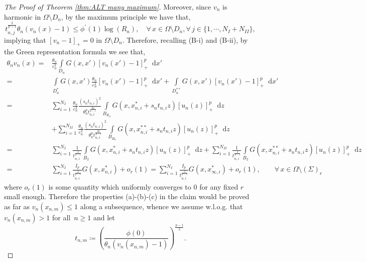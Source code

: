 \documentclass[10pt]{amsart}
\newcommand{\parenthesis}[1]{\left(#1\right)} %
\newcommand{\dd}{\mathop{}\!\mathrm{d}}
\newcommand{\eps}{\varepsilon}
\newcommand{\ii}{\infty}
\newcommand{\om}{\Omega}
\begin{document}
\begin{proof}[The Proof of Theorem \ref{thm:ALT many maximum}]
    Moreover, since $v_n$ is harmonic in $\om\setminus D_n$, by the maximum principle we have that,
    $$
    t_{n,j}^{\frac{2}{p-1}}\theta_n (v_n(x)-1)\leq \phi^{'}(1)\log(R_n),\quad \forall\,x \in \om\setminus D_n, \forall \,j\in\{1,\cdots,N_I+N_{II}\},
    $$
    implying that $[v_n-1]_+=0$ in  $\om\setminus D_n$. Therefore, recalling (B-i) and (B-ii), by the Green representation formula we see that,
    \begin{align} \nonumber
  \theta_n  v_n(x)= &\frac{\theta_n}{\eps_n^2}\int\limits_{D_n}G(x,x')[v_n(x')-1]^p_+\dd{x'}\\ \nonumber
    =&\int\limits_{D^*_n}G(x,x')\frac{\theta_n}{\eps_n^2}[v_n(x')-1]^p_+\dd{x'}+
   \int\limits_{D^{**}_n}G(x,x')[v_n(x')-1]^p_+\dd{x'}\\ \nonumber
   =& \sum_{i=1}^{N_I} \frac{\theta_n}{\eps_n^2} \frac{(s_nt_{n,i})^2}{\theta_n^p t_{n,i}^{\frac{2p}{p-1}}} \int\limits_{B_{R_{n}}}
   G(x,x^*_{n,i}+ s_n t_{n,i}z)[u_n(z)]_+^p\dd{z}\\\nonumber
   & +\sum_{i=1}^{N_{II}} \frac{\theta_n}{\eps_n^2} \frac{(s_nt_{n,i})^2}{\theta_n^p t_{n,i}^{\frac{2p}{p-1}}} \int\limits_{B_{R_{n}}}
   G(x,x^{**}_{n,i}+ s_n t_{n,i}z)[u_n(z)]_+^p\dd{z}\\\nonumber
   =& \sum_{i=1}^{N_I}\frac{1}{t_{n,i}^{\frac{2}{p-1}}}\int\limits_{B_{2}}
   G(x,x^*_{n,i}+ s_n t_{n,i}z)[u_n(z)]_+^p\dd{z}+\sum_{i=1}^{N_{II}} \frac{1}{t_{n,i}^{\frac{2}{p-1}}}\int\limits_{B_{2}}
   G(x,x^{**}_{n,i}+ s_n t_{n,i}z)[u_n(z)]_+^p\dd{z}\\ \label{green:1}
   =&\sum_{i=1}^{N_I} \frac{I_p}{t_{n,i}^{\frac{2}{p-1}}}G(x,x^*_{n,i})+o_r(1)=\sum_{i=1}^{N_I} \frac{I_p}{t_{n,i}^{\frac{2}{p-1}}}G(x,x^*_{\ii,i})+o_r(1),\qquad \forall\, x\in \om\setminus (\Sigma)_r
    \end{align}
   where $o_r(1)$ is some quantity which uniformly converges to $0$ for any fixed $r$ small enough. Therefore the properties (a)-(b)-(c) in the claim
   would be proved as far as $v_n(x_{n,m})\leq 1$ along a subsequence, whence we assume w.l.o.g. that $v_n(x_{n,m})>1$ for all~$n\geq 1$ and
   let~
   $$
   t_{n,m}\coloneqq \parenthesis{\frac{\phi(0)}{\theta_n (v_n(x_{n,m})-1)}}^{\frac{p-1}{2}}.
   $$


\end{proof}
\end{document}
